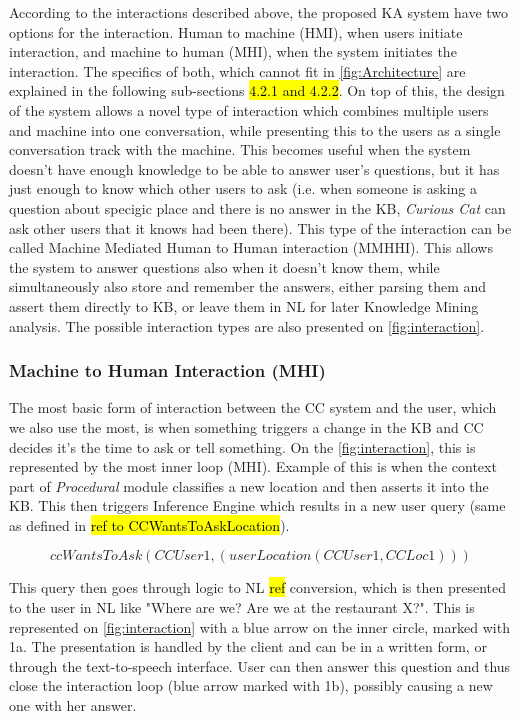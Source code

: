According to the interactions described above, the proposed KA system have two 
options for the interaction. Human to machine (HMI), when users initiate 
interaction, and machine to human (MHI), when the system initiates the 
interaction. The specifics of both, which cannot fit in 
\autoref{fig:Architecture} are explained in the following sub-sections 
\hl{4.2.1 and 4.2.2}. On top of this, the design of the system allows a novel 
type of interaction which combines multiple users and machine into one 
conversation, while presenting this to the users as a single conversation track
with the machine. This becomes useful when the system doesn't have enough
knowledge to be able to answer user's questions, but it has just enough to know
which other users to ask (i.e. when someone is asking a question about specigic
place and there is no answer in the KB, \emph{Curious Cat} can ask other users
that it knows had been there). This type of the interaction can be called
Machine Mediated Human to Human interaction (MMHHI). This allows the system
to answer questions also when it doesn't know them, while simultaneously also
store and remember the answers, either parsing them and assert them directly to 
KB, or leave them in NL for later Knowledge Mining analysis. The possible
interaction types are also presented on \autoref{fig:interaction}.

\subsubsection{Machine to Human Interaction (MHI)}
\label{section:mhi}
The most basic form of interaction between the CC system and the user, which
we also use the most, is when something triggers a change in the KB and 
CC decides it's the time to ask or tell something. On the 
\autoref{fig:interaction}, this is represented by the most inner loop (MHI). 
Example of this is when the context part of \emph{Procedural} module classifies
a new location and then asserts it into the KB. This then triggers Inference 
Engine which results in a new user query (same as defined in 
\hl{ref to CCWantsToAskLocation}).

\begin{equation*}
	\label{eq:ccWantsLoc}
	ccWantsToAsk(CCUser1, (userLocation(CCUser1,CCLoc1)))
\end{equation*}

This query then goes through logic to NL \hl{ref} conversion, which is then
presented to the user in NL like "Where are we? Are we at the restaurant X?".
This is represented on \autoref{fig:interaction} with a blue arrow on the
inner circle, marked with 1a. The presentation is handled by the client and 
can be in a written form, or through the text-to-speech interface. User can then 
answer this question and thus close the interaction loop (blue arrow marked with
1b), possibly causing a new one with her answer. 


